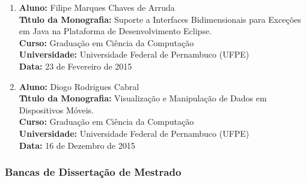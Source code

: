 \documentclass[a4paper,oneside,10pt]{article}
\begin{document}
\begin{enumerate}
\renewcommand{\labelenumi}{{\large\bfseries\arabic{enumi}.}}
\vspace{0.3cm}

\item       \textbf{Aluno:} Filipe Marques Chaves de Arruda \mbox{}\\
            \textbf{T\'{\i}tulo da Monografia:} Suporte a Interfaces Bidimensionais para Exceções em Java na Plataforma de Desenvolvimento Eclipse.\\
            \textbf{Curso:} Graduação em Ciência da Computação\\
            \textbf{Universidade:} Universidade Federal de Pernambuco (UFPE)\\
            \textbf{Data:} 23 de Fevereiro de 2015\\

\item       \textbf{Aluno:} Diogo Rodrigues Cabral \mbox{}\\
            \textbf{T\'{\i}tulo da Monografia:} Visualização e Manipulação de Dados em Dispositivos Móveis.\\
            \textbf{Curso:} Graduação em Ciência da Computação\\
            \textbf{Universidade:} Universidade Federal de Pernambuco (UFPE)\\
            \textbf{Data:} 16 de Dezembro de 2015\\

\end{enumerate}


\subsubsection{Bancas de Disserta\c{c}\~{a}o de Mestrado}
\vspace{0.3cm}
\end{document}
